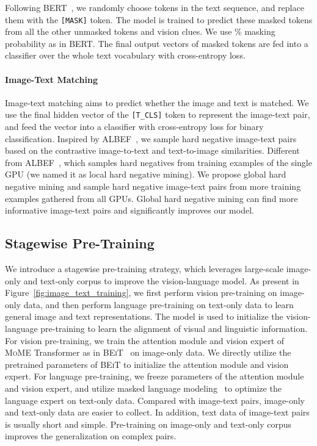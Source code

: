 \documentclass{article}
\newcommand{\sptk}[1]{\texttt{[#1]}}
\newcommand\mome{\textsc{MoME}}
\newcommand\beit{\textsc{BEiT}}
\begin{document}
Following BERT~\citep{bert}, we randomly choose tokens in the text sequence, and replace them with the \sptk{MASK} token. 
The model is trained to predict these masked tokens from all the other unmasked tokens and vision clues. 
We use \% masking probability as in BERT.
The final output vectors of masked tokens are fed into a classifier over the whole text vocabulary with cross-entropy loss.

\paragraph{Image-Text Matching}

Image-text matching aims to predict whether the image and text is matched.
We use the final hidden vector of the \sptk{T\_CLS} token to represent the image-text pair, and feed the vector into a classifier with cross-entropy loss for binary classification.
Inspired by ALBEF~\citep{albef}, we sample hard negative image-text pairs based on the contrastive image-to-text and text-to-image similarities.
Different from ALBEF~\citep{albef}, which samples hard negatives from training examples of the single GPU (we named it as local hard negative mining). 
We propose global hard negative mining and sample hard negative image-text pairs from more training examples gathered from all GPUs.
Global hard negative mining can find more informative image-text pairs and significantly improves our model. 


\subsection{Stagewise Pre-Training}
\label{sec:stagewise_pretraining}

We introduce a stagewise pre-training strategy, which leverages large-scale image-only and text-only corpus to improve the vision-language model.
As present in Figure~\ref{fig:image_text_training}, we first perform vision pre-training on image-only data, and then perform language pre-training on text-only data to learn general image and text representations. 
The model is used to initialize the vision-language pre-training to learn the alignment of visual and linguistic information.
For vision pre-training, we train the attention module and vision expert of \mome{} Transformer as in \beit{}~\citep{beit} on image-only data.
We directly utilize the pretrained parameters of \beit{} to initialize the attention module and vision expert.
For language pre-training, we freeze parameters of the attention module and vision expert, and utilize masked language modeling~\citep{bert} to optimize the language expert on text-only data.
Compared with image-text pairs, image-only and text-only data are easier to collect.
In addition, text data of image-text pairs is usually short and simple.
Pre-training on image-only and text-only corpus improves the generalization on complex pairs.
\end{document}
